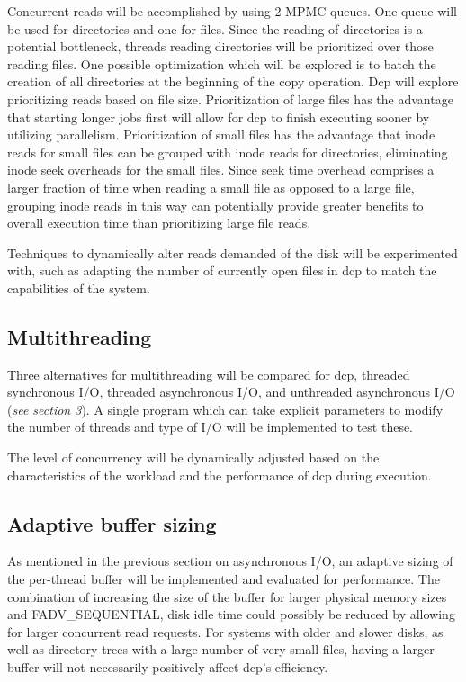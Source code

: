 \documentclass[12pt]{article}
\begin{document}
Concurrent reads will be accomplished by using 2 MPMC queues.
One queue will be used for directories and one for files.
Since the reading of directories is a potential bottleneck, threads
reading directories will be prioritized over those reading files.
One possible optimization which will be explored is to batch the
creation of all directories at the beginning of the copy operation.
Dcp will explore prioritizing reads based on file size.
Prioritization of large files has the advantage that starting
longer jobs first will allow for dcp to finish executing sooner
by utilizing parallelism.
Prioritization of small files has the advantage that
inode reads for small files can be grouped with inode reads for
directories, eliminating inode seek overheads for the small files.
Since seek time overhead comprises a larger fraction of time when
reading a small file as opposed to a large file, grouping inode
reads in this way can potentially provide greater benefits to
overall execution time than prioritizing large file reads.

Techniques to dynamically alter reads demanded of the disk will be
experimented with, such as adapting the number of currently open files
in dcp to match the capabilities of the system.

\subsection{Multithreading}
Three alternatives for multithreading will be compared for dcp,
threaded synchronous I/O, threaded asynchronous I/O, and unthreaded
asynchronous I/O (\textit{see section 3}). A single program which
can take explicit parameters to modify the number of threads and
type of I/O will be implemented to test these.

The level of concurrency will be dynamically adjusted based
on the characteristics of the workload and the performance
of dcp during execution.

\subsection{Adaptive buffer sizing}
As mentioned in the previous section on asynchronous I/O, an adaptive
sizing of the per-thread buffer will be implemented and evaluated for
performance. The combination of increasing the size of the buffer for
larger physical memory sizes and FADV\_SEQUENTIAL, disk idle time could
possibly be reduced by allowing for larger concurrent read requests.
For systems with older and slower disks, as well as directory trees
with a large number of very small files, having a larger buffer
will not necessarily positively affect dcp's efficiency.
\end{document}

